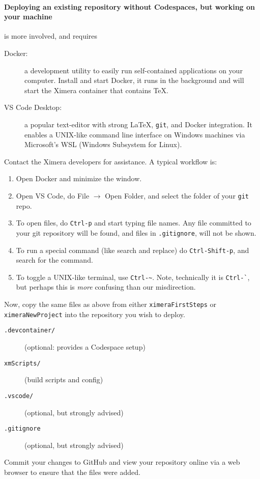 \documentclass{ximera}
\begin{document}
\paragraph{Deploying an existing repository without Codespaces, but working on your machine} is more involved, and requires
\begin{description}
    \item[Docker:] a development utility to easily run
        self-contained applications on your
        computer. Install and start Docker, it runs in the background and will start the Ximera container that contains TeX.
    \item[VS Code Desktop:] a popular text-editor with strong \LaTeX, \verb!git!,
        and Docker integration. It enables a UNIX-like command line interface on
        Windows machines via Microsoft's WSL (Windows Subsystem for Linux).
\end{description}
Contact the Ximera developers for assistance. A typical workflow is:
\begin{enumerate}
    \item Open Docker and minimize the window.
    \item Open VS Code, do File $\to$ Open Folder, and select the
          folder of your \verb!git! repo.
    \item To open files, do \verb!Ctrl-p! and start typing file names. Any
          file
          committed to your git repository will be found, and files in
          \verb!.gitignore!, will not be shown.
    \item To run a special command (like search and replace) do
          \verb!Ctrl-Shift-p!, and search for the command.
    \item To toggle a UNIX-like terminal, use \verb!Ctrl-~!. Note, technically
          it is \verb!Ctrl-`!, but perhaps this is \textit{more} confusing than our
          misdirection.
\end{enumerate}

Now, copy the same files as above from either \verb!ximeraFirstSteps! or
\verb!ximeraNewProject!
into the repository you wish to deploy.
\begin{description}
    \item[\texttt{.devcontainer/}] (optional: provides a Codespace setup) 
    \item[\texttt{xmScripts/}]  (build scripts and config)
    \item[\texttt{.vscode/}]  (optional, but strongly advised)
    \item[\texttt{.gitignore}]	(optional, but strongly advised)
\end{description}
Commit your changes to GitHub and view your repository online via a web browser
to ensure that the files were added.
\end{document}
